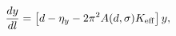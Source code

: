 \begin{equation}
\label{flowy2}
\frac{dy}{dl}=\left[d-\eta_y-2\pi^2A(d,\sigma)K_{\rm eff}\right]y,
\end{equation}

